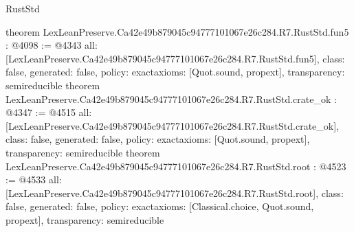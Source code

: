 \begin{lexlean}{RustStd}
\begin{coremodule}
{}
theorem LexLeanPreserve.Ca42e49b879045c94777101067e26c284.R7.RustStd.fun5 : @4098 := @4343 {
  all: [LexLeanPreserve.Ca42e49b879045c94777101067e26c284.R7.RustStd.fun5],
  class: false,
  generated: false,
  policy: exact{axioms: [Quot.sound, propext]},
  transparency: semireducible
}
theorem LexLeanPreserve.Ca42e49b879045c94777101067e26c284.R7.RustStd.crate_ok : @4347 := @4515 {
  all: [LexLeanPreserve.Ca42e49b879045c94777101067e26c284.R7.RustStd.crate_ok],
  class: false,
  generated: false,
  policy: exact{axioms: [Quot.sound, propext]},
  transparency: semireducible
}
theorem LexLeanPreserve.Ca42e49b879045c94777101067e26c284.R7.RustStd.root : @4523 := @4533 {
  all: [LexLeanPreserve.Ca42e49b879045c94777101067e26c284.R7.RustStd.root],
  class: false,
  generated: false,
  policy: exact{axioms: [Classical.choice, Quot.sound, propext]},
  transparency: semireducible
}


\end{coremodule}
\end{lexlean}
